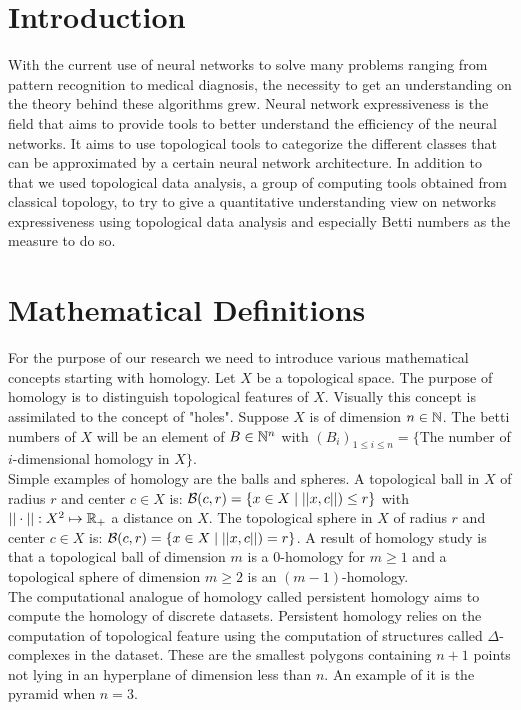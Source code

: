 \documentclass[12pt, a4paper]{article}
\begin{document}
\begin{multicols}{2}
  \section{Introduction}
With the current use of neural networks to solve many problems ranging from pattern recognition to medical diagnosis, the necessity to get an understanding on the theory behind these algorithms grew. Neural network expressiveness is the field that aims to provide tools to better understand the efficiency of the neural networks. It aims to use topological tools to categorize the different classes that can be approximated by a certain neural network architecture. In addition to that we used topological data analysis, a group of computing tools obtained from classical topology, to try to give a quantitative understanding view on networks expressiveness using topological data analysis and especially Betti numbers as the measure to do so.

\section{Mathematical Definitions}

For the purpose of our research we need to introduce various mathematical concepts starting with homology.  Let $X$ be a topological space. The purpose of homology is to distinguish topological features of $X$. Visually this concept is assimilated to the concept of "holes". Suppose $X$ is of dimension $n \in \mathbb{N}$. The betti numbers of $X$ will be an element of $B \in \mathbb{N}^n$ with $(B_i)_{1 \le i \le n} = \{$The number of $i$-dimensional homology in $X \}$.\\

Simple examples of homology are the balls and spheres. A topological ball in $X$ of radius $r$ and center $c \in X$ is: $\mathcal{B}(c,r) = \{x \in X \mid ||x,c||) \le r\}$ with $||\cdot|| : X^2 \mapsto \mathbb{R}_+$ a distance on $X$. The topological sphere in $X$ of radius $r$ and center $c \in X$ is: $\mathcal{B}(c,r) = \{x \in X \mid ||x,c||) = r\}$. A result of homology study is that a topological ball of dimension $m$ is a 0-homology for $m \ge 1$ and a topological sphere of dimension $m \ge 2$ is an $(m - 1)$-homology.\\

The computational analogue of homology called persistent homology aims to compute the homology of discrete datasets. Persistent homology relies on the computation of topological feature using the computation of structures called $\Delta$-complexes in the dataset. These are the smallest polygons containing $n+1$ points not lying in an hyperplane of dimension less than $n$. An example of it is the pyramid when $n = 3$.\\


\end{multicols}
\end{document}
